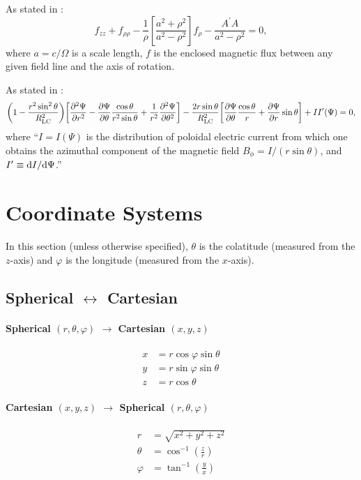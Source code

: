 \documentclass{book}
\newcommand{\phase}{\varphi}
\newcommand{\pd}[2]{\frac{\partial {#1}}{\partial {#2}}}
\newcommand{\ppd}[2]{\frac{\partial^2{#1}}{\partial {#2}^2}}
\begin{document}
As stated in \citet{Michel1982}:
\begin{equation}
    f_{zz} + f_{\rho\rho} - \frac{1}{\rho}\left[\frac{a^2 + \rho^2}{a^2 - \rho^2}\right] f_\rho -
    \frac{A^\prime A}{a^2 - \rho^2} = 0,
\end{equation}
where $a = c/\Omega$ is a scale length, $f$ is the enclosed magnetic flux between any given field line and the axis of rotation.

As stated in \citet{Contopoulos2024}:
\begin{equation}
    \bigg( 1 - \frac{r^2\sin^2\theta}{R_{\rm LC}^2} \bigg)
    \bigg[ \ppd{\Psi}{r} - \pd{\Psi}{\theta} \frac{\cos\theta}{r^2\sin\theta} + \frac{1}{r^2} \ppd{\Psi}{\theta} \bigg] -
    \frac{2r \sin\theta}{R_{\rm LC}^2} \bigg[ \pd{\Psi}{\theta} \frac{\cos\theta}{r} + \pd{\Psi}{r} \sin\theta \bigg] +
    I I^\prime(\Psi) = 0,
\end{equation}
where ``$I = I(\Psi)$ is the distribution of poloidal electric current from which one obtains the azimuthal component of the magnetic field $B_\phi = I/(r \sin\theta)$, and $I^\prime \equiv {\rm d}I/{\rm d}\Psi$.''


\chapter{Coordinate Systems}

In this section (unless otherwise specified), $\theta$ is the colatitude (measured from the $z$-axis) and $\phase$ is the longitude (measured from the $x$-axis).

\section{Spherical $\leftrightarrow$ Cartesian}

\subsubsection{Spherical $(r,\theta,\phase)$ $\rightarrow$ Cartesian $(x,y,z)$}
\begin{equation}
    \begin{aligned}
        x &= r \cos\phase\sin\theta \\
        y &= r \sin\phase\sin\theta \\
        z &= r \cos\theta
    \end{aligned}
\end{equation}
\subsubsection{Cartesian $(x,y,z)$ $\rightarrow$ Spherical $(r,\theta,\phase)$}
\begin{equation}
    \begin{aligned}
        r &= \sqrt{x^2+y^2+z^2} \\
        \theta &= \cos^{-1} \left(\frac{z}{r}\right) \\
        \phase &= \tan^{-1} \left(\frac{y}{x}\right)
    \end{aligned}
\end{equation}
\end{document}

